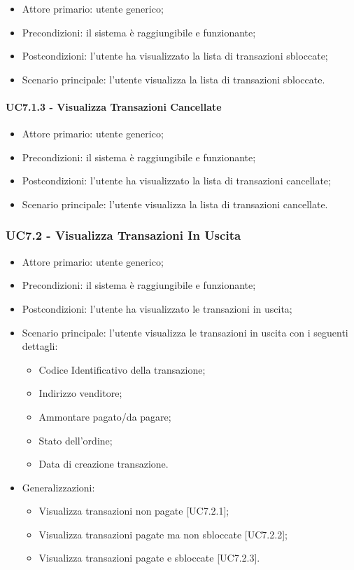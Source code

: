 \begin{itemize}
    \item Attore primario: utente generico;
    \item Precondizioni: il sistema è raggiungibile e funzionante;
    \item Postcondizioni: l'utente ha visualizzato la lista di transazioni sbloccate;
    \item Scenario principale: l'utente visualizza la lista di transazioni sbloccate.
\end{itemize}

\paragraph{UC7.1.3 - Visualizza Transazioni Cancellate}

\begin{itemize}
    \item Attore primario: utente generico;
    \item Precondizioni: il sistema è raggiungibile e funzionante;
    \item Postcondizioni: l'utente ha visualizzato la lista di transazioni cancellate;
    \item Scenario principale: l'utente visualizza la lista di transazioni cancellate.
\end{itemize}

\subsubsection{UC7.2 - Visualizza Transazioni In Uscita}

\begin{itemize}
    \item Attore primario: utente generico;
    \item Precondizioni: il sistema è raggiungibile e funzionante;
    \item Postcondizioni: l'utente ha visualizzato le transazioni in uscita;
    \item Scenario principale: l'utente visualizza le transazioni in uscita con i seguenti dettagli:
        \begin{itemize}
            \item Codice Identificativo della transazione;
            \item Indirizzo venditore;
            \item Ammontare pagato/da pagare;
            \item Stato dell'ordine;
            \item Data di creazione transazione.
        \end{itemize}
    \item Generalizzazioni:
          \begin{itemize}
              \item Visualizza transazioni non pagate [UC7.2.1];
              \item Visualizza transazioni pagate ma non sbloccate [UC7.2.2];
              \item Visualizza transazioni pagate e sbloccate [UC7.2.3].
          \end{itemize}
\end{itemize}

